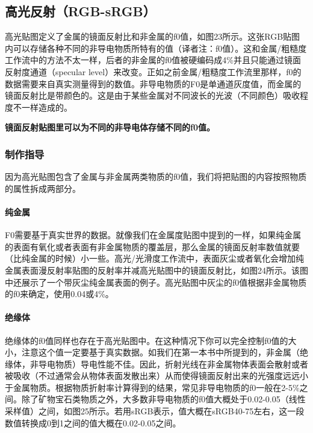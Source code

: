 \subsection{高光反射（RGB-sRGB）}

高光贴图定义了金属的镜面反射比和非金属的f0值，如图23所示。这张RGB贴图内可以存储各种不同的非导电物质所特有的值（译者注：f0值）。这和金属/粗糙度工作流中的方法不太一样，后者的非金属的f0值被硬编码成4\%并且只能通过镜面反射度通道（specular level）来改变。正如之前金属/粗糙度工作流里那样，f0的数据需要来自真实测量得到的数值。非导电物质的F0是单通道灰度值，而金属的镜面反射比是带颜色的。这是由于某些金属对不同波长的光波（不同颜色）吸收程度不一样造成的。

\textbf{镜面反射贴图里可以为不同的非导电体存储不同的f0值。}

\subsubsection{制作指导}

因为高光贴图包含了金属与非金属两类物质的f0值，我们将把贴图的内容按照物质的属性拆成两部分。

\paragraph{纯金属}

F0需要基于真实世界的数据。就像我们在金属度贴图中提到的一样，如果纯金属的表面有氧化或者表面有非金属物质的覆盖层，那么金属的镜面反射率数值就要（比纯金属的时候）小一些。高光/光滑度工作流中，表面灰尘或者氧化会增加纯金属表面漫反射率贴图的反射率并减高光贴图中的镜面反射比，如图24所示。该图中还展示了一个带灰尘纯金属表面的例子。高光贴图中灰尘的f0值根据非金属物质的f0来确定，使用0.04或4\%。

\paragraph{绝缘体}

绝缘体的f0值同样也存在于高光贴图中。在这种情况下你可以完全控制f0值的大小，注意这个值一定要基于真实数据。如我们在第一本书中所提到的，非金属（绝缘体，非导电物质）导电性能不佳。因此，折射光线在非金属物体表面会散射或者被吸收（不过通常会从物体表面发散出来）从而使得镜面反射出来的光强度远远小于金属物质。根据物质折射率计算得到的结果，常见非导电物质的f0一般在2-5\%之间。除了矿物宝石类物质之外，大多数非导电物质的f0值大概处于0.02-0.05（线性采样值）之间，如图25所示。若用sRGB表示，值大概在sRGB40-75左右，这一段数值转换成0到1之间的值大概在0.02-0.05之间。

